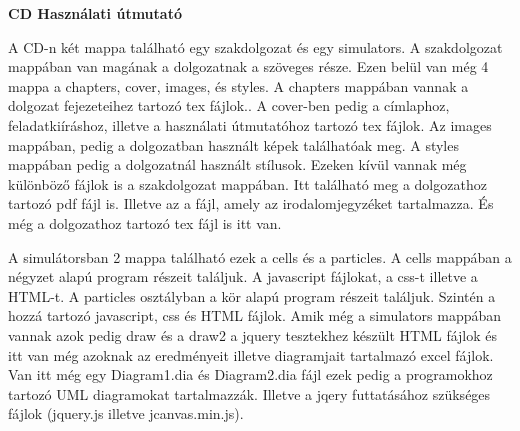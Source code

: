 \pagestyle{empty}

\noindent \textbf{\Large CD Használati útmutató}

\vskip 1cm


A CD-n két mappa található egy szakdolgozat és egy simulators. A szakdolgozat mappában van magának a dolgozatnak a szöveges része. Ezen belül van még 4 mappa a chapters, cover, images, és styles. A chapters mappában vannak a dolgozat fejezeteihez tartozó tex fájlok.. A cover-ben pedig a címlaphoz, feladatkiíráshoz, illetve a használati útmutatóhoz tartozó tex fájlok. Az images mappában, pedig a dolgozatban használt képek találhatóak meg. A styles mappában pedig a dolgozatnál használt stílusok. Ezeken kívül vannak még különböző fájlok is a szakdolgozat mappában. Itt található meg a dolgozathoz tartozó pdf fájl is. Illetve az a fájl, amely az irodalomjegyzéket tartalmazza. És még a dolgozathoz tartozó tex fájl is itt van. 

\bigskip

A simulátorsban 2 mappa található ezek a cells és a particles. A cells mappában a négyzet alapú program részeit találjuk. A javascript fájlokat, a css-t illetve a HTML-t. 
A particles osztályban a kör alapú program részeit találjuk. Szintén a hozzá tartozó javascript, css és HTML fájlok. 
Amik még a simulators mappában vannak azok pedig draw és a draw2 a jquery tesztekhez készült HTML fájlok és itt van még azoknak az eredményeit illetve diagramjait tartalmazó excel fájlok. Van itt még egy Diagram1.dia és Diagram2.dia fájl ezek pedig a programokhoz tartozó UML diagramokat tartalmazzák. Illetve a jqery futtatásához szükséges fájlok (jquery.js illetve jcanvas.min.js).